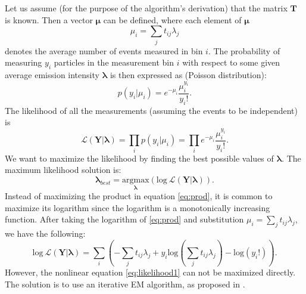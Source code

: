 Let us assume (for the purpose of the algorithm's derivation) that the matrix $\mathbf{T}$ is known.
Then a vector $\bm{\mu}$ can be defined, where each element of $\bm{\mu}$ 
\begin{equation}
  \mu_{i} = \sum_{j} t_{ij}\lambda_{j}
  \label{eq:mu}
\end{equation}
denotes the average number of events measured in bin $i$.
The probability of measuring $y_{i}$ particles in the measurement bin $i$ with respect to some given average emission intensity $\bm{\lambda}$ is then expressed as (Poisson distribution):
\begin{equation}
  p(y_{i} |\mu_{i} ) = e^{-\mu_{i}} \frac{\mu_{i}^{y_i}}{y_{i}!}.
\end{equation}
The likelihood of all the measurements (assuming the events to be independent) is
\begin{equation}  
  \mathcal{L}(\mathbf{Y} | \mathbf{\lambda}) = \prod_{i}p(y_{i} |\mu_{i} ) = \prod_{i} e^{-\mu_{i}} \frac{\mu_{i}^{y_i}}{y_{i}!}.
  \label{eq:prod}
\end{equation}
We want to maximize the likelihood by finding the best possible values of $\bm{\lambda}$. 
The maximum likelihood solution is:
\begin{equation}
  \mathbf{\lambda}_{best} = \underset{\mathbf{\lambda}}{\mathrm{argmax}}( \mathrm{log}\ \mathcal{L}(\mathbf{Y} | \mathbf{\lambda})).
\end{equation}
Instead of maximizing the product in equation \ref{eq:prod}, it is common to maximize its logarithm since the logarithm is a monotonically increasing function.
After taking the logarithm of \ref{eq:prod} and substitution $\mu_{i} = \sum_{j} t_{ij}\lambda_{j}$, we have the following:
\begin{equation}  
  \mathrm{log}\ \mathcal{L}(\mathbf{Y} | \mathbf{\lambda}) = \sum_{i}\left ( -\sum_{j} t_{ij}\lambda_{j} + y_{i} \mathrm{log}(\sum_{j} t_{ij}\lambda_{j})  - \mathrm{log}(y_{i}!) \right ).
  \label{eq:likelihood1}
\end{equation}
However, the nonlinear equation \ref{eq:likelihood1} can not be maximized directly.
The solution is to use an iterative \ac{EM} algorithm, as proposed in \cite{MLEM_Lange_Carlson_1984}.
